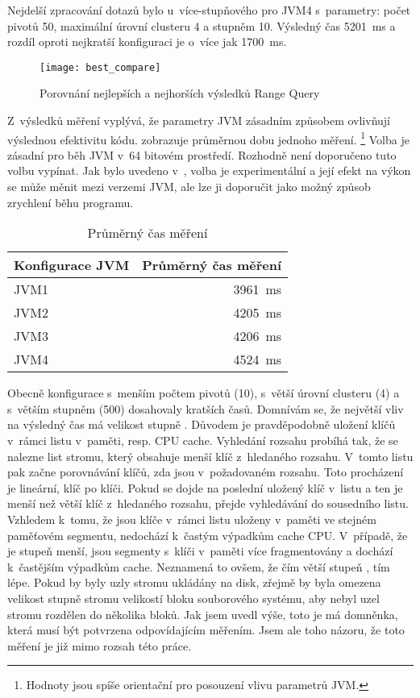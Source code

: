 Nejdelší zpracování dotazů bylo u~více-stupňového  pro JVM4 s~parametry: počet pivotů 50, maximální úrovní clusteru 4 a stupněm \BPTree{} 10.
Výsledný čas \SI{5201}{\ms} a rozdíl oproti nejkratší konfiguraci je o~více jak \SI{1700}{\ms}.

\begin{figure}[h]
\centering
\texttt{[image: best\_compare]}
\caption{Porovnání nejlepších a nejhorších výsledků Range Query}
\label{fig:jvm1p50}
\end{figure}

Z~výsledků měření vyplývá, že parametry JVM zásadním způsobem ovlivňují výslednou efektivitu kódu.
 zobrazuje průměrnou dobu jednoho měření.
\footnote{Hodnoty jsou spíše orientační pro posouzení vlivu parametrů JVM.}
Volba  je zásadní pro běh JVM v~64 bitovém prostředí.
Rozhodně není doporučeno tuto volbu vypínat.
Jak bylo uvedeno v~, volba  je experimentální a její efekt na výkon se může měnit mezi verzemi JVM, ale lze ji doporučit jako možný způsob zrychlení běhu programu.

\begin{table}[h]
\center
\begin{tabular}{| l  | r |}
\hline
Konfigurace JVM & Průměrný čas měření \\ \hline
\hline
JVM1 & \SI{3961}{\ms} \\ \hline
JVM2 & \SI{4205}{\ms} \\ \hline
JVM3 & \SI{4206}{\ms} \\ \hline
JVM4 & \SI{4524}{\ms} \\ \hline
\end{tabular}
\caption{Průměrný čas měření}
\label{tab:jvmavgtime}
\end{table}

Obecně konfigurace s~menším počtem pivotů (10), s~větší úrovní clusteru (4) a s~větším stupněm \BPTree{} (500) dosahovaly kratších časů.
Domnívám se, že největší vliv na výsledný čas má velikost stupně \BPTree.
Důvodem je pravděpodobně uložení klíčů v~rámci listu v~paměti, resp. CPU cache.
Vyhledání rozsahu probíhá tak, že se nalezne list stromu, který obsahuje menší klíč z~hledaného rozsahu.
V~tomto listu pak začne porovnávání klíčů, zda jsou v~požadovaném rozsahu.
Toto procházení je lineární, klíč po klíči.
Pokud se dojde na poslední uložený klíč v~listu a ten je menší než větší klíč z~hledaného rozsahu, přejde vyhledávání do sousedního listu.
Vzhledem k~tomu, že jsou klíče v~rámci listu uloženy v~paměti ve stejném paměťovém segmentu, nedochází k~častým výpadkům cache CPU.
V~případě, že je stupeň \BPTree{} menší, jsou segmenty s~klíči v~paměti více fragmentovány a dochází k~častějším výpadkům cache.
Neznamená to ovšem, že čím větší stupeň \BPTree{}, tím lépe. 
Pokud by byly uzly stromu ukládány na disk, zřejmě by byla omezena velikost stupně stromu velikostí bloku souborového systému, aby nebyl uzel stromu rozdělen do několika bloků.
Jak jsem uvedl výše, toto je má domněnka, která musí být potvrzena odpovídajícím měřením.
Jsem ale toho názoru, že toto měření je již mimo rozsah této práce.

